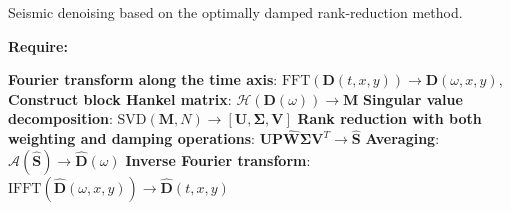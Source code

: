 {\begin{algorithm}
   \caption{Seismic denoising based on the optimally damped rank-reduction method. }
   \textbf{Require:} 
    \begin{algorithmic}[1]
    \State \textbf{Fourier transform along the time axis}: $\text{FFT}\left(\mathbf{D}(t,x,y)\right)\rightarrow \mathbf{D}(\omega,x,y)$, 
     \State \textbf{Construct block Hankel matrix}: $\mathcal{H}(\mathbf{D}(\omega))\rightarrow \mathbf{M}$
     \State \textbf{Singular value decomposition}: $\text{SVD}(\mathbf{M},N)\rightarrow [\mathbf{U},\boldsymbol{\Sigma},\mathbf{V}]$
     \State \textbf{Rank reduction with both weighting and damping operations}: $\mathbf{U}\mathbf{P}\hat{\mathbf{W}}\boldsymbol{\Sigma}\mathbf{V}^T\rightarrow \hat{\mathbf{S}}$
     \State \textbf{Averaging}: $\mathcal{A}(\hat{\mathbf{S}})\rightarrow \hat{\mathbf{D}}(\omega)$
        \EndFor 
         \State \textbf{Inverse Fourier transform}: $\text{IFFT}\left(\hat{\mathbf{D}}(\omega,x,y)\right)\rightarrow \hat{\mathbf{D}}(t,x,y)$
\end{algorithmic}
\label{alg:alg3}
\end{algorithm}}




